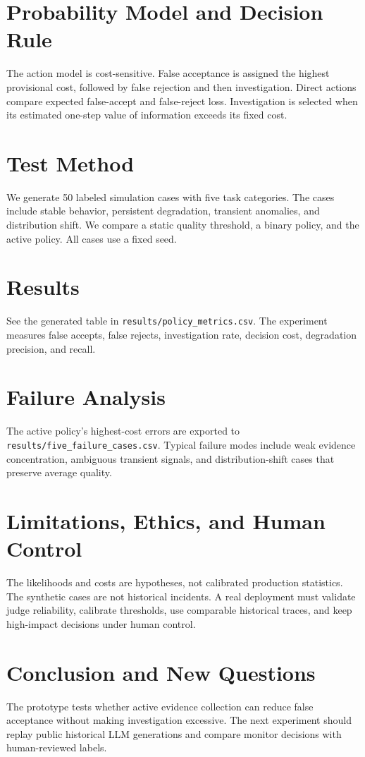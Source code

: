 \documentclass[10pt]{article}
\begin{document}
\section{Probability Model and Decision Rule}
The action model is cost-sensitive. False acceptance is assigned the highest provisional cost, followed by false rejection and then investigation. Direct actions compare expected false-accept and false-reject loss. Investigation is selected when its estimated one-step value of information exceeds its fixed cost.

\section{Test Method}
We generate 50 labeled simulation cases with five task categories. The cases include stable behavior, persistent degradation, transient anomalies, and distribution shift. We compare a static quality threshold, a binary policy, and the active policy. All cases use a fixed seed.

\section{Results}
See the generated table in \texttt{results/policy\_metrics.csv}. The experiment measures false accepts, false rejects, investigation rate, decision cost, degradation precision, and recall.

\section{Failure Analysis}
The active policy's highest-cost errors are exported to \texttt{results/five\_failure\_cases.csv}. Typical failure modes include weak evidence concentration, ambiguous transient signals, and distribution-shift cases that preserve average quality.

\section{Limitations, Ethics, and Human Control}
The likelihoods and costs are hypotheses, not calibrated production statistics. The synthetic cases are not historical incidents. A real deployment must validate judge reliability, calibrate thresholds, use comparable historical traces, and keep high-impact decisions under human control.

\section{Conclusion and New Questions}
The prototype tests whether active evidence collection can reduce false acceptance without making investigation excessive. The next experiment should replay public historical LLM generations and compare monitor decisions with human-reviewed labels.
\end{document}
